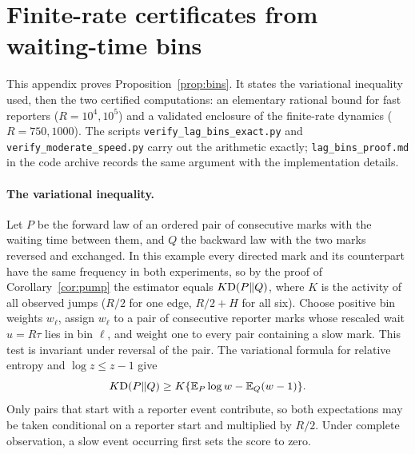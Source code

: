 \section{Finite-rate certificates from waiting-time bins}\label{app:bins}
This appendix proves Proposition~\ref{prop:bins}. It states the variational inequality used, then the two certified computations: an elementary rational bound for fast reporters ($R=10^4,10^5$) and a validated enclosure of the finite-rate dynamics ($R=750,1000$). The scripts \texttt{verify\_lag\_bins\_exact.py} and \texttt{verify\_moderate\_speed.py} carry out the arithmetic exactly; \texttt{lag\_bins\_proof.md} in the code archive records the same argument with the implementation details.

\paragraph{The variational inequality.} Let $P$ be the forward law of an ordered pair of consecutive marks with the waiting time between them, and $Q$ the backward law with the two marks reversed and exchanged. In this example every directed mark and its counterpart have the same frequency in both experiments, so by the proof of Corollary~\ref{cor:pump} the estimator equals $K\mathrm D(P\|Q)$, where $K$ is the activity of all observed jumps ($R/2$ for one edge, $R/2+H$ for all six). Choose positive bin weights $w_\ell$, assign $w_\ell$ to a pair of consecutive reporter marks whose rescaled wait $u=R\tau$ lies in bin $\ell$, and weight one to every pair containing a slow mark. This test is invariant under reversal of the pair. The variational formula for relative entropy and $\log z\le z-1$ give
\[
 K\mathrm D(P\|Q)\ge K\{\mathbb E_P\log w-\mathbb E_Q(w-1)\}.
\]
Only pairs that start with a reporter event contribute, so both expectations may be taken conditional on a reporter start and multiplied by $R/2$. Under complete observation, a slow event occurring first sets the score to zero.

